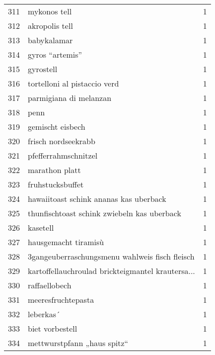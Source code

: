 \begin{tabular}{llr}
311 &                                       mykonos tell &      1 \\
312 &                                     akropolis tell &      1 \\
313 &                                        babykalamar &      1 \\
314 &                                    gyros “artemis” &      1 \\
315 &                                          gyrostell &      1 \\
316 &                       tortelloni al pistaccio verd &      1 \\
317 &                             parmigiana di melanzan &      1 \\
318 &                                               penn &      1 \\
319 &                                   gemischt eisbech &      1 \\
320 &                                frisch nordseekrabb &      1 \\
321 &                               pfefferrahmschnitzel &      1 \\
322 &                                     marathon platt &      1 \\
323 &                                   fruhstucksbuffet &      1 \\
324 &             hawaiitoast schink ananas kas uberback &      1 \\
325 &        thunfischtoast schink zwiebeln kas uberback &      1 \\
326 &                                           kasetell &      1 \\
327 &                               hausgemacht tiramisù &      1 \\
328 &     3gangeuberraschungsmenu wahlweis fisch fleisch &      1 \\
329 &  kartoffellauchroulad brickteigmantel krautersa... &      1 \\
330 &                                      raffaellobech &      1 \\
331 &                                 meeresfruchtepasta &      1 \\
332 &                                          leberkas´ &      1 \\
333 &                                    biet vorbestell &      1 \\
334 &                        mettwurstpfann „haus spitz“ &      1 \\

\end{tabular}
